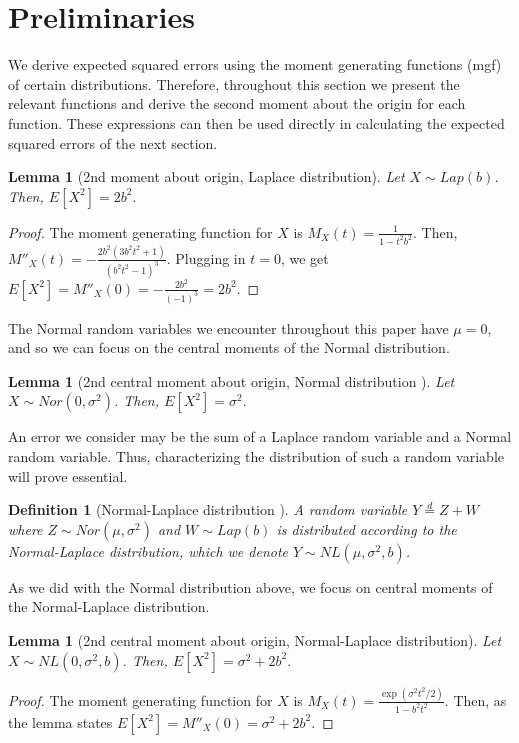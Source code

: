 \documentclass{article}
\theoremstyle{plain}
\newtheorem{lem}[thm]{Lemma}
\newtheorem{defn}[thm]{Definition}
\begin{document}
\section{Preliminaries}
We derive expected squared errors using the moment generating functions (mgf) of certain distributions. Therefore, throughout this section we present the relevant functions and derive the second moment about the origin for each function. These expressions can then be used directly in calculating the expected squared errors of the next section. 

\begin{lem}[2nd moment about origin, Laplace distribution]
Let $X \sim Lap(b)$. Then, $E[X^2] = 2b^2.$
\end{lem}
\begin{proof}
The moment generating function for $X$ is $M_X(t) = \frac{1}{1 - t^2b^2}.$
Then, $M''_X(t) = -\frac{2b^2(3b^2t^2 + 1)}{(b^2t^2 - 1)^3}.$
Plugging in $t = 0$, we get 
$E[X^2] = M''_X(0) = -\frac{2b^2}{(-1)^3} = 2b^2.$
\end{proof}

The Normal random variables we encounter throughout this paper have $\mu = 0$, and so we can focus on the central moments of the Normal distribution.

\begin{lem}[2nd central moment about origin, Normal distribution \cite{papoulis2002probability}]
Let $X \sim Nor(0, \sigma^2)$. Then,
$E[X^2] = \sigma^2.$
\end{lem}

An error we consider may be the sum of a Laplace random variable and a Normal random variable. Thus, characterizing the distribution of such a random variable will prove essential.

\begin{defn}[Normal-Laplace distribution \cite{Reed2006}]
A random variable $Y \overset{d}{=} Z + W$ where $Z \sim Nor(\mu, \sigma^2)$ and $W \sim Lap(b)$ is distributed according to the Normal-Laplace distribution, which we denote $Y \sim NL(\mu, \sigma^2, b)$.
\end{defn}

As we did with the Normal distribution above, we focus on central moments of the Normal-Laplace distribution.

\begin{lem}[2nd central moment about origin, Normal-Laplace distribution]
\label{nl_secmom}
Let $X \sim NL(0, \sigma^2, b)$. Then, 
$E[X^2] = \sigma^2 + 2b^2.$
\end{lem}
\begin{proof}
The moment generating function for $X$ is
$M_X(t) = \frac{\exp(\sigma^2t^2/2)}{1 - b^2t^2}.$
Then, as the lemma states
$E[X^2] = M''_X(0) = \sigma^2 + 2b^2.$
\end{proof}
\end{document}

